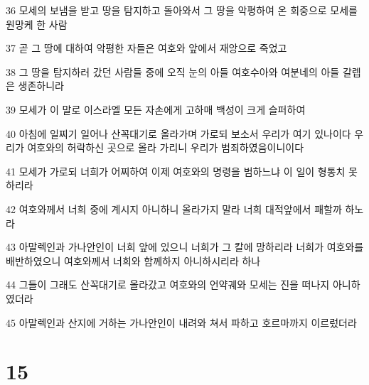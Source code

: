 \par 36 모세의 보냄을 받고 땅을 탐지하고 돌아와서 그 땅을 악평하여 온 회중으로 모세를 원망케 한 사람
\par 37 곧 그 땅에 대하여 악평한 자들은 여호와 앞에서 재앙으로 죽었고
\par 38 그 땅을 탐지하러 갔던 사람들 중에 오직 눈의 아들 여호수아와 여분네의 아들 갈렙은 생존하니라
\par 39 모세가 이 말로 이스라엘 모든 자손에게 고하매 백성이 크게 슬퍼하여
\par 40 아침에 일찌기 일어나 산꼭대기로 올라가며 가로되 보소서 우리가 여기 있나이다 우리가 여호와의 허락하신 곳으로 올라 가리니 우리가 범죄하였음이니이다
\par 41 모세가 가로되 너희가 어찌하여 이제 여호와의 명령을 범하느냐 이 일이 형통치 못하리라
\par 42 여호와께서 너희 중에 계시지 아니하니 올라가지 말라 너희 대적앞에서 패할까 하노라
\par 43 아말렉인과 가나안인이 너희 앞에 있으니 너희가 그 칼에 망하리라 너희가 여호와를 배반하였으니 여호와께서 너희와 함께하지 아니하시리라 하나
\par 44 그들이 그래도 산꼭대기로 올라갔고 여호와의 언약궤와 모세는 진을 떠나지 아니하였더라
\par 45 아말렉인과 산지에 거하는 가나안인이 내려와 쳐서 파하고 호르마까지 이르렀더라

\chapter{15}

